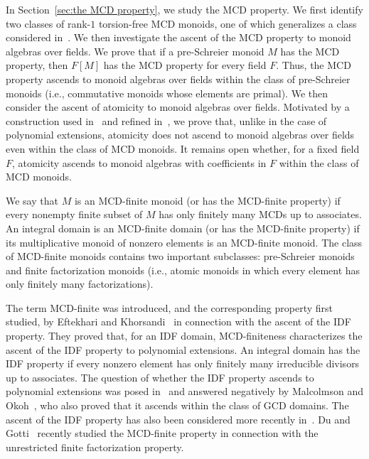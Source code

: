 \documentclass[10pt]{amsart}
\theoremstyle{definition}
\theoremstyle{remark}
\numberwithin{equation}{section}
\begin{document}
In Section~\ref{sec:the MCD property}, we study the MCD property. We first identify two classes of rank-$1$ torsion-free MCD monoids, one of which generalizes a class considered in~\cite[Section~5]{LWZ24}. We then investigate the ascent of the MCD property to monoid algebras over fields. We prove that if a pre-Schreier monoid $M$ has the MCD property, then $F[M]$ has the MCD property for every field $F$. Thus, the MCD property ascends to monoid algebras over fields within the class of pre-Schreier monoids (i.e., commutative monoids whose elements are primal). We then consider the ascent of atomicity to monoid algebras over fields. Motivated by a construction used in~\cite{CG19} and refined in~\cite{GGP25}, we prove that, unlike in the case of polynomial extensions, atomicity does not ascend to monoid algebras over fields even within the class of MCD monoids. It remains open whether, for a fixed field $F$, atomicity ascends to monoid algebras with coefficients in $F$ within the class of MCD monoids.
\smallskip

We say that $M$ is an MCD-finite monoid (or has the MCD-finite property) if every nonempty finite subset of $M$ has only finitely many MCDs up to associates. An integral domain is an MCD-finite domain (or has the MCD-finite property) if its multiplicative monoid of nonzero elements is an MCD-finite monoid. The class of MCD-finite monoids contains two important subclasses: pre-Schreier monoids and finite factorization monoids (i.e., atomic monoids in which every element has only finitely many factorizations).
\smallskip

The term MCD-finite was introduced, and the corresponding property first studied, by Eftekhari and Khorsandi~\cite{EK18} in connection with the ascent of the IDF property. They proved that, for an IDF domain, MCD-finiteness characterizes the ascent of the IDF property to polynomial extensions. An integral domain has the IDF property if every nonzero element has only finitely many irreducible divisors up to associates. The question of whether the IDF property ascends to polynomial extensions was posed in~\cite[Question~2]{AAZ90} and answered negatively by Malcolmson and Okoh~\cite{MO09}, who also proved that it ascends within the class of GCD domains. The ascent of the IDF property has also been considered more recently in~\cite{GZ23,GP25}. Du and Gotti~\cite{DG26} recently studied the MCD-finite property in connection with the unrestricted finite factorization property.
\smallskip
\end{document}
